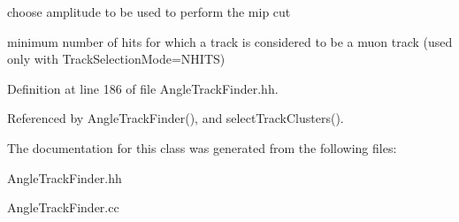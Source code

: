 choose amplitude to be used to perform the mip cut 

minimum number of hits for which a track is considered to be a muon track (used only with Track\-Selection\-Mode=N\-H\-I\-T\-S) 

Definition at line 186 of file Angle\-Track\-Finder.\-hh.



Referenced by Angle\-Track\-Finder(), and select\-Track\-Clusters().



The documentation for this class was generated from the following files\-:\begin{DoxyCompactItemize}
\item 
Angle\-Track\-Finder.\-hh\item 
Angle\-Track\-Finder.\-cc\end{DoxyCompactItemize}
